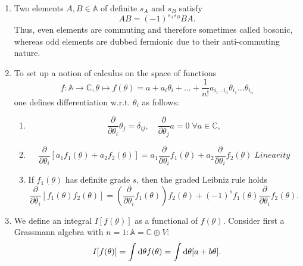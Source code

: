 \begin{enumerate}
\item Two elements $A,B\in  \mathbb{A}$ of definite $s_A$ and $s_B$ satisfy
\begin{equation}
	AB= (-1)^{s_A s_B} BA.
\end{equation}
Thus, even elements are commuting and therefore sometimes called bosonic, whereas odd elements are dubbed fermionic due to their anti-commuting nature.
\item To set up a notion of calculus on the space of functions
\begin{equation}
	f:\mathbb{A} \rightarrow \mathbb{C}, \underbar{\theta} \mapsto f(\underbar{\theta}) = a + a_i \theta_i+\dots + \frac{1}{n!} a_{i_1 \dots i_n} \theta_{i_1} \dots \theta_{i_n}
\end{equation}
one defines differentiation w.r.t. $\theta_i$ as follows:
\begin{enumerate}
	\item \begin{equation}
		\frac{\partial}{\partial \theta_i} \theta_j = \delta_{ij}, \quad \frac{\partial}{\partial \theta_j} a= 0 \; \forall a\in \mathbb{C},
	\end{equation}
	\item \begin{equation}
		\frac{\partial}{\partial \theta_i} \left[a_1 f_1(\underbar{\theta}) + a_2 f_2(\underbar{\theta}) \right] = a_1 \frac{\partial}{\partial \theta_i} f_1(\underbar{\theta}) + a_2 \frac{\partial}{\partial \theta_i} f_2(\underbar{\theta}) \; Linearity
	\end{equation}
	\item If $f_1(\underbar{\theta})$ has definite grade $s$, then the graded Leibniz rule holds
	\begin{equation}
		\frac{\partial}{\partial \theta_i} \left[f_1(\underbar{\theta})f_2(\underbar{\theta}) \right] = \left(\frac{\partial}{\partial \theta_i} f_1(\underbar{\theta})\right)f_2(\underbar{\theta}) + (-1)^s f_1(\underbar{\theta}) \frac{\partial}{\partial \theta_i} f_2(\underbar{\theta}).
	\end{equation}
\end{enumerate}
\item We define an integral $I[f(\underbar{\theta })]$ as a functional of $f(\underbar{\theta})$. Consider first a Grassmann algebra with $n=1: \mathbb{A}=\mathbb{C} \oplus V:$
\begin{equation}
	I[f(\theta)] = \int  \mathrm{d} \theta f(\theta) = \int \mathrm{d} \theta [a + b \theta].
\end{equation}

\end{enumerate}
